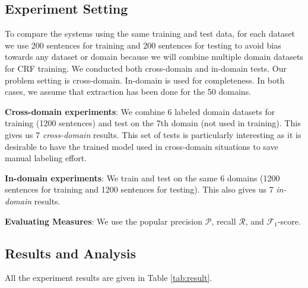 \documentclass[11pt,a4paper]{article}
\theoremstyle{definition}
\begin{document}
    
\subsection{Experiment Setting} 

To compare the systems using the same training and test data, for each dataset we use 200 sentences for training and 200 sentences for testing to avoid bias towards any dataset or domain because we will combine multiple domain datasets for CRF training. We conducted both cross-domain and in-domain tests. Our problem setting is cross-domain. In-domain is used for completeness. In both cases, we assume that extraction has been done for the 50 domains. 
    
    
    {\bf Cross-domain experiments}: We combine 6 labeled domain datasets for training (1200 sentences) and test on the 7th domain (not used in training). This gives us 7 {\em cross-domain} results. This set of tests is particularly interesting as it is desirable to have the trained model used in cross-domain situations to save manual labeling effort. 
    
    {\bf In-domain experiments}: We train and test on the same 6 domains (1200 sentences for training and 1200 sentences for testing). This also gives us 7 {\em in-domain} results. %
    
    
    {\bf Evaluating Measures}: 
    We use the popular precision $\mathcal{P}$, recall $\mathcal{R}$, and $\mathcal{F}_1$-score. %
    
    \subsection{Results and Analysis}
    
    All the experiment results are given in Table \ref{tab:result}. %
    
\end{document}
